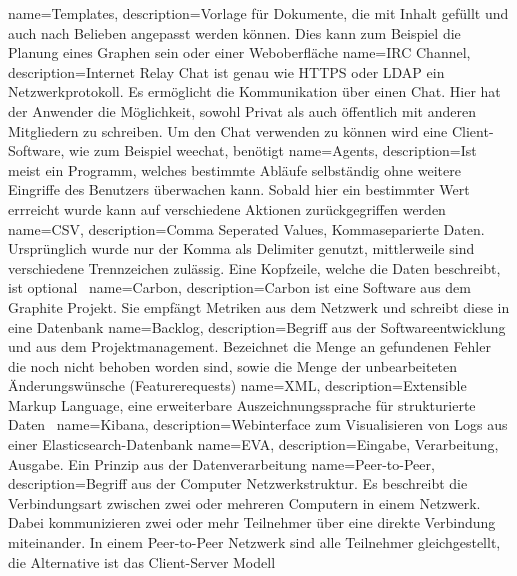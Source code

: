 {
  name=Templates,
  description={Vorlage für Dokumente, die mit Inhalt
               gefüllt und auch nach Belieben angepasst werden können. Dies
               kann zum Beispiel die Planung eines Graphen sein oder einer
               Weboberfläche}
}
{
  name=IRC Channel,
  description={Internet Relay Chat ist genau wie \gls{HTTPS} oder \gls{LDAP}
               ein Netzwerkprotokoll. Es ermöglicht die Kommunikation über einen
               Chat. Hier hat der Anwender die Möglichkeit, sowohl Privat als
               auch öffentlich mit anderen Mitgliedern zu schreiben. Um den Chat
               verwenden zu können wird eine Client-Software, wie zum Beispiel
               weechat, benötigt}
}
{
  name=Agents,
  description={Ist meist ein Programm, welches bestimmte Abläufe selbständig
              ohne weitere Eingriffe des Benutzers überwachen kann. Sobald
              hier ein bestimmter Wert errreicht wurde kann auf
              verschiedene Aktionen zurückgegriffen werden}
}
{
  name=CSV,
  description={Comma Seperated Values, Kommaseparierte Daten.
              Ursprünglich wurde nur der Komma als Delimiter genutzt,
              mittlerweile sind verschiedene Trennzeichen zulässig. Eine
              Kopfzeile, welche die Daten beschreibt, ist
              optional~\cite{RFC4180}}
}
{
  name=Carbon,
  description={Carbon ist eine Software aus dem Graphite Projekt. Sie empfängt
               Metriken aus dem Netzwerk und schreibt diese in eine Datenbank}
}
{
  name=Backlog,
  description={Begriff aus der Softwareentwicklung und aus dem
               Projektmanagement. Bezeichnet die Menge an gefundenen Fehler die
               noch nicht behoben worden sind, sowie die Menge der
               unbearbeiteten Änderungswünsche (Featurerequests)}
}
{
  name=XML,
  description={Extensible Markup Language, eine erweiterbare
               Auszeichnungssprache für strukturierte
               Daten~\cite{xml_definition}}
}
{
  name=Kibana,
  description={Webinterface zum Visualisieren von Logs aus einer
               Elasticsearch-Datenbank}
}
{
  name=EVA,
  description={Eingabe, Verarbeitung, Ausgabe. Ein Prinzip aus der
               Datenverarbeitung}
}
{
  name=Peer-to-Peer,
  description={Begriff aus der Computer Netzwerkstruktur. Es beschreibt die
               Verbindungsart zwischen zwei oder mehreren Computern in einem
               Netzwerk. Dabei kommunizieren zwei oder mehr Teilnehmer über
               eine direkte Verbindung miteinander. In einem Peer-to-Peer
               Netzwerk sind alle Teilnehmer gleichgestellt, die Alternative
               ist das Client-Server Modell}
}
